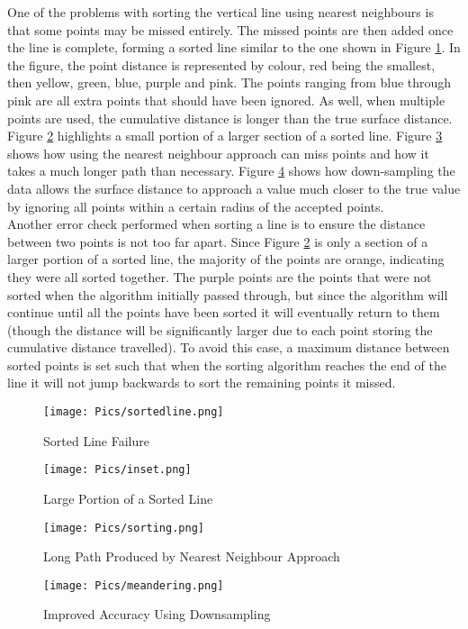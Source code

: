 One of the problems with sorting the vertical line using nearest neighbours is that some points may be missed entirely. The missed points are then added once the line is complete, forming a sorted line similar to the one shown in Figure \ref{fig:sline}. In the figure, the point distance is represented by colour, red being the smallest, then yellow, green, blue, purple and pink. The points ranging from blue through pink are all extra points that should have been ignored. As well, when multiple points are used, the cumulative distance is longer than the true surface distance. Figure \ref{fig:inset} highlights a small portion of a larger section of a sorted line. Figure \ref{fig:meandering} shows how using the nearest neighbour approach can miss points and how it takes a much longer path than necessary. Figure \ref{fig:downsampledpath} shows how down-sampling the data allows the surface distance to approach a value much closer to the true value by ignoring all points within a certain radius of the accepted points. \\

Another error check performed when sorting a line is to ensure the distance between two points is not too far apart. Since Figure \ref{fig:inset} is only a section of a larger portion of a sorted line, the majority of the points are orange, indicating they were all sorted together. The purple points are the points that were not sorted when the algorithm initially passed through, but since the algorithm will continue until all the points have been sorted it will eventually return to them (though the distance will be significantly larger due to each point storing the cumulative distance travelled). To avoid this case, a maximum distance between sorted points is set such that when the sorting algorithm reaches the end of the line it will not jump backwards to sort the remaining points it missed.\\

\begin{figure}[H]
    \centering
    \texttt{[image: Pics/sortedline.png]}
    \caption{Sorted Line Failure}
    \label{fig:sline}
\end{figure}
\begin{figure}[H]
    \centering
    \texttt{[image: Pics/inset.png]}
    \caption{Large Portion of a Sorted Line}
    \label{fig:inset}
\end{figure}
\begin{figure}[H]
    \centering
    \texttt{[image: Pics/sorting.png]}
    \caption{Long Path Produced by Nearest Neighbour Approach}
    \label{fig:meandering}
\end{figure}
\begin{figure}[H]
    \centering
    \texttt{[image: Pics/meandering.png]}
    \caption{Improved Accuracy Using Downsampling}
    \label{fig:downsampledpath}
\end{figure}

